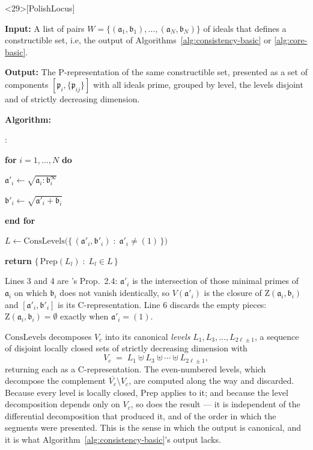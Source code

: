 \documentclass{article}
\theoremstyle{definition}
\theoremstyle{plain}
\newcounter{algline}
\newenvironment{pseudocode}
  {\begin{list}{\arabic{algline}:}%
     {\usecounter{algline}%
      \setlength{\leftmargin}{2.4em}\setlength{\labelwidth}{1.5em}%
      \setlength{\labelsep}{0.5em}\setlength{\itemsep}{1pt}%
      \setlength{\parsep}{0pt}\setlength{\topsep}{5pt}}}
  {\end{list}}
\newcommand{\algind}{\hspace*{1.3em}}
\begin{document}
\begin{algorithm}<29>[PolishLocus]
\label{alg:consistency-comp}
\mbox{}

{\bf Input:} A list of pairs $W = \{ (\mathfrak{a}_1, \mathfrak{b}_1), \ldots, (\mathfrak{a}_N, \mathfrak{b}_N) \}$
of ideals that defines a constructible set,
i.e, the output of Algorithms~\ref{alg:consistency-basic} or \ref{alg:core-basic}.

{\bf Output:} The P-representation of the same constructible set, presented as
a set of components
$[\mathfrak{p}_i, \{\mathfrak{p}_{ij}\}]$ with all ideals prime, grouped by
level, the levels disjoint and of strictly decreasing dimension.

{\bf Algorithm:}
\begin{pseudocode}
\item {\bf for} $i = 1, \ldots, N$ {\bf do}
\item \algind $\mathfrak{a}'_i \leftarrow \sqrt{\mathfrak{a}_i : \mathfrak{b}_i^\infty}$
\item \algind $\mathfrak{b}'_i \leftarrow \sqrt{\mathfrak{a}'_i + \mathfrak{b}_i}$
\item {\bf end for}
\item $L \leftarrow \mathrm{ConsLevels}\bigl( \{\, (\mathfrak{a}'_i, \mathfrak{b}'_i) \;:\; \mathfrak{a}'_i \ne (1) \,\} \bigr)$
\item {\bf return} $\{\, \mathrm{Prep}(L_l) \;:\; L_l \in L \,\}$
\end{pseudocode}

Lines 3 and 4 are \cite{BrunatMontes}'s Prop.~2.4: $\mathfrak{a}'_i$ is the
intersection of those minimal primes of $\mathfrak{a}_i$ on which
$\mathfrak{b}_i$ does not vanish identically, so $V(\mathfrak{a}'_i)$ is the
closure of $\mathrm{Z}(\mathfrak{a}_i, \mathfrak{b}_i)$ and
$[\mathfrak{a}'_i, \mathfrak{b}'_i]$ is its C-representation.  Line 6 discards
the empty pieces: $\mathrm{Z}(\mathfrak{a}_i, \mathfrak{b}_i) = \emptyset$
exactly when $\mathfrak{a}'_i = (1)$.

$\mathrm{ConsLevels}$ decomposes $V_c$ into its canonical {\it levels}
$L_1, L_3, \ldots, L_{2\ell \pm 1}$, a sequence of disjoint locally closed sets of
strictly decreasing dimension with
\[
V_c \;=\; L_1 \uplus L_3 \uplus \cdots \uplus L_{2\ell \pm 1},
\]
returning each as a C-representation.  The even-numbered levels, which decompose the
complement $\overline{V_c} \setminus V_c$, are computed along the way and
discarded.  Because every level is locally closed, $\mathrm{Prep}$ applies to it; and
because the level decomposition depends only on $V_c$, so does the result --- it
is independent of the differential decomposition that produced it, and of the order in
which the segments were presented.  This is the sense in which the output is canonical,
and it is what Algorithm~\ref{alg:consistency-basic}'s output lacks.
\end{algorithm}
\end{document}
